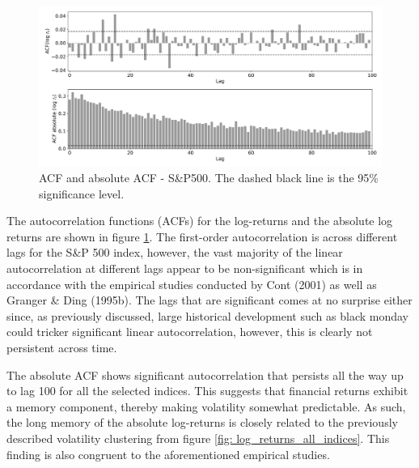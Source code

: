 \begin{figure}[H] 
    \centering
    \includegraphics[width=1\textwidth]{analysis/data_description/images/SP500_ACF.png}
    \caption{ACF and absolute ACF - S\&P500. The dashed black line is the 95\% significance level.}
    \label{fig: ACF_all_log_returns}
\end{figure}

The autocorrelation functions (ACFs) for the log-returns and the absolute log returns are shown in figure \ref{fig: ACF_all_log_returns}. The first-order autocorrelation is across different lags for the S\&P 500 index, however, the vast majority of the linear autocorrelation at different lags appear to be non-significant which is in accordance with the empirical studies conducted by Cont (2001) as well as Granger \& Ding (1995b). The lags that are significant comes at no surprise either since, as previously discussed, large historical development such as black monday could tricker significant linear autocorrelation, however, this is clearly not persistent across time. 

The absolute ACF shows significant autocorrelation that persists all the way up to lag 100 for all the selected indices. This suggests that financial returns exhibit a memory component, thereby making volatility somewhat predictable. As such, the long memory of the absolute log-returns is closely related to the previously described volatility clustering from figure \ref{fig: log_returns_all_indices}. This finding is also congruent to the aforementioned empirical studies. 
